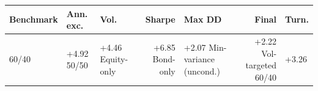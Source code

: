 \begin{tabular}{lllrlrl}
\toprule
Benchmark & Ann. exc. & Vol. & Sharpe & Max DD & Final & Turn. \\
\midrule
60/40 & +4.92%
50/50 & +4.46%
Equity-only & +6.85%
Bond-only & +2.07%
Min-variance (uncond.) & +2.22%
Vol-targeted 60/40 & +3.26%
\bottomrule
\end{tabular}
